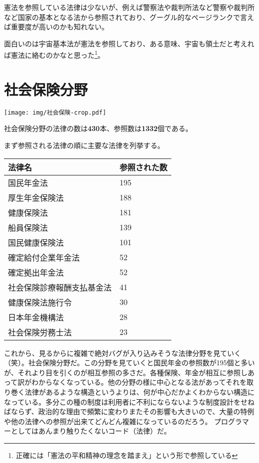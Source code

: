 \documentclass[a5j,openany,twoside]{jsbook}
\begin{document}
憲法を参照している法律は少ないが、例えば警察法や裁判所法など警察や裁判所など国家の基本となる法から参照されており、グーグル的なページランクで言えば重要度が高いのかも知れない。

面白いのは宇宙基本法が憲法を参照しており、ある意味、宇宙も領土だと考えれば憲法に絡むのかなと思った\footnote{正確には「憲法の平和精神の理念を踏まえ」という形で参照している}。

\section{社会保険分野}

\texttt{[image: img/社会保険-crop.pdf]}

社会保険分野の法律の数は\textbf{430}本、参照数は\textbf{1332}個である。

まず参照される法律の順に主要な法律を列挙する。


\begin{table}[htb]
  \begin{tabular}{|l|l|}  \hline
法律名 & 参照された数 \\ \hline \hline
国民年金法 & 195 \\
厚生年金保険法 & 188 \\
健康保険法 & 181 \\
船員保険法 & 139 \\
国民健康保険法 & 101 \\
確定給付企業年金法 & 52 \\
確定拠出年金法 & 52 \\
社会保険診療報酬支払基金法 & 41 \\
健康保険法施行令 & 30 \\
日本年金機構法 & 28 \\
社会保険労務士法 & 23 \\ \hline
  \end{tabular}
\end{table}

これから、見るからに複雑で絶対バグが入り込みそうな法律分野を見ていく（笑）。社会保険分野だ。この分野を見ていくと国民年金の参照数が195個と多いが、それより目を引くのが相互参照の多さだ。各種保険、年金が相互に参照しあって訳がわからなくなっている。他の分野の様に中心となる法があってそれを取り巻く法律があるような構造というよりは、何が中心だかよくわからない構造になっている。多分この種の制度は利用者に不利にならないような制度設計をせねばならず、政治的な理由で頻繁に変わりまたその影響も大きいので、大量の特例や他の法律への参照が出来てどんどん複雑になっているのだろう。
プログラマーとしてはあんまり触りたくないコード（法律）だ。
\end{document}
